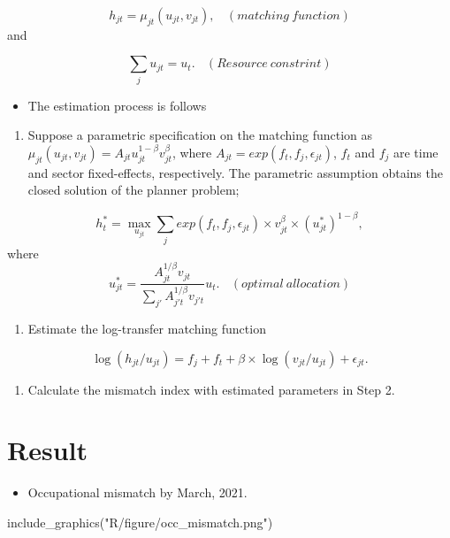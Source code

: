 \documentclass[
]{book}
\newenvironment{Shaded}{\begin{snugshade}}{\end{snugshade}}
\newcommand{\FunctionTok}[1]{\textcolor[rgb]{0.00,0.00,0.00}{#1}}
\newcommand{\NormalTok}[1]{#1}
\newcommand{\StringTok}[1]{\textcolor[rgb]{0.31,0.60,0.02}{#1}}
\providecommand{\tightlist}{%
  \setlength{\itemsep}{0pt}\setlength{\parskip}{0pt}}
\begin{document}
\[h_{jt}=\mu_{jt}(u_{jt},v_{jt}),\ \ \ \ (matching\ function)\]
and

\[\sum_{j}u_{jt}=u_t.\ \ \ \ (Resource\ constrint)\]

\begin{itemize}
\tightlist
\item
  The estimation process is follows
\end{itemize}

\begin{enumerate}
\def\labelenumi{\arabic{enumi}.}
\tightlist
\item
  Suppose a parametric specification on the matching function as \(\mu_{jt}(u_{jt},v_{jt})=A_{jt}u_{jt}^{1-\beta}v_{jt}^{\beta}\), where \(A_{jt}=exp(f_t,f_j,\epsilon_{jt})\), \(f_t\) and \(f_j\) are time and sector fixed-effects, respectively.
  The parametric assumption obtains the closed solution of the planner problem;
\end{enumerate}

\[h_t^*=\max_{u_{jt}} \sum_j exp(f_t,f_j,\epsilon_{jt})\times v_{jt}^{\beta}\times (u_{jt}^*)^{1-\beta},\]
where
\[u_{jt}^*=\frac{A_{jt}^{1/\beta}v_{jt}}{\sum_{j'}A_{j't}^{1/\beta}v_{j't}}u_{t}.\ \ \ \ (optimal\ allocation)\]

\begin{enumerate}
\def\labelenumi{\arabic{enumi}.}
\setcounter{enumi}{1}
\tightlist
\item
  Estimate the log-transfer matching function
\end{enumerate}

\[\log(h_{jt}/u_{jt})=f_{j}+f_{t}+\beta\times\log(v_{jt}/u_{jt})+\epsilon_{jt}.\]

\begin{enumerate}
\def\labelenumi{\arabic{enumi}.}
\setcounter{enumi}{2}
\tightlist
\item
  Calculate the mismatch index with estimated parameters in Step 2.
\end{enumerate}

\hypertarget{result}{%
\chapter{Result}\label{result}}

\begin{itemize}
\tightlist
\item
  Occupational mismatch by March, 2021.
\end{itemize}

\begin{Shaded}
\begin{Highlighting}[]
\FunctionTok{include\_graphics}\NormalTok{(}\StringTok{"R/figure/occ\_mismatch.png"}\NormalTok{)}
\end{Highlighting}
\end{Shaded}
\end{document}
